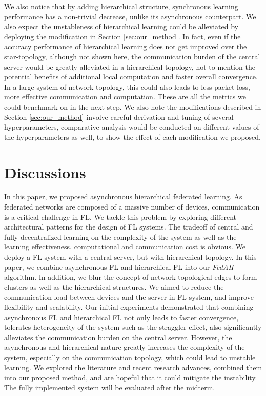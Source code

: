 \documentclass[10pt,twocolumn,letterpaper]{article}
\theoremstyle{definition}
\begin{document}
We also notice that by adding hierarchical structure, synchronous learning performance has a non-trivial decrease, unlike its asynchronous counterpart. We also expect the unstableness of hierarchical learning could be alleviated by deploying the modification in Section \ref{sec:our_method}. In fact, even if the accuracy performance of hierarchical learning does not get improved over the star-topology, although not shown here, the communication burden of the central server would be greatly alleviated in a hierarchical topology, not to mention the potential benefits of additional local computation and faster overall convergence. In a large system of network topology, this could also leads to less packet loss, more effective communication and computation. These are all the metrics we could benchmark on in the next step. We also note the modifications described in Section \ref{sec:our_method} involve careful derivation and tuning of several hyperparameters, comparative analysis would be conducted on different values of the hyperparameters as well, to show the effect of each modification we proposed.


\section{Discussions}

In this paper, we proposed asynchronous hierarchical federated learning. 
As federated networks are composed of a massive number of devices, communication is a critical challenge in FL. We tackle this problem by exploring different architectural patterns for the design of FL systems. The tradeoff of central and fully decentralized learning on the complexity of the system as well as the learning effectiveness, computational and communication cost is obvious. We deploy a FL system with a central server, but with hierarchical topology. In this paper, we combine asynchronous FL and hierarchical FL into our \textit{FedAH} algorithm. In addition, we blur the concept of network topological edges to form clusters as well as the hierarchical structures. We aimed to reduce the communication load between devices and the server in FL system, and improve flexibility and scalability. Our initial experiments demonstrated that combining asynchronous FL and hierarchical FL not only leads to faster convergence, tolerates heterogeneity of the system such as the straggler effect, also significantly alleviates the communication burden on the central server. However, the asynchronous and hierarchical nature greatly increases the complexity of the system, especially on the communication topology, which could lead to unstable learning. 
We explored the literature and recent research advances, combined them into our proposed method, and are hopeful that it could mitigate the instability. The fully implemented system will be evaluated after the midterm.
\end{document}
